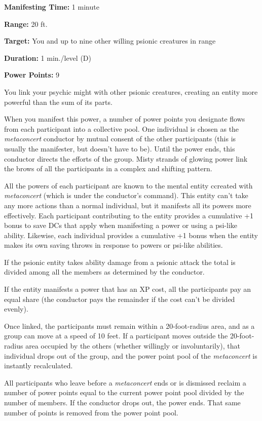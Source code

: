\documentclass{article}
\begin{document}
\textbf{Manifesting Time:} 1 minute

\textbf{Range:} 20 ft.

\textbf{Target:} You and up to nine other willing psionic creatures in range

\textbf{Duration:} 1 min./level (D)

\textbf{Power Points:} 9

You link your psychic might with other psionic creatures, creating an entity more 
powerful than the sum of its parts.

When you manifest this power, a number of power points you designate flows from 
each participant into a collective pool. One individual is chosen as the \textit{metaconcert 
}conductor by mutual consent of the other participants (this is usually the manifester, 
but doesn't have to be). Until the power ends, this conductor directs the efforts 
of the group. Misty strands of glowing power link the brows of all the participants 
in a complex and shifting pattern.

All the powers of each participant are known to the mental entity ccreated with 
\textit{metaconcert }(which is under the conductor's command). This entity can't 
take any more actions than a normal individual, but it manifests all its powers 
more effectively. Each participant contributing to the entity provides a cumulative 
+1 bonus to save DCs that apply when manifesting a power or using a psi-like ability. 
Likewise, each individual provides a cumulative +1 bonus when the entity makes 
its own saving throws in response to powers or psi-like abilities.

If the psionic entity takes ability damage from a psionic attack\textit{ }the total 
is divided among all the members as determined by the conductor.

If the entity manifests a power that has an XP cost, all the participants pay an 
equal share (the conductor pays the remainder if the cost can't be divided evenly).

Once linked, the participants must remain within a 20-foot-radius area, and as 
a group can move at a speed of 10 feet. If a participant moves outside the 20-foot-radius 
area occupied by the others (whether willingly or involuntarily), that individual 
drops out of the group, and the power point pool of the \textit{metaconcert }is 
instantly recalculated.

All participants who leave before a \textit{metaconcert }ends or is dismissed reclaim 
a number of power points equal to the current power point pool divided by the number 
of members. If the conductor drops out, the power ends. That same number of points 
is removed from the power point pool.
\end{document}
